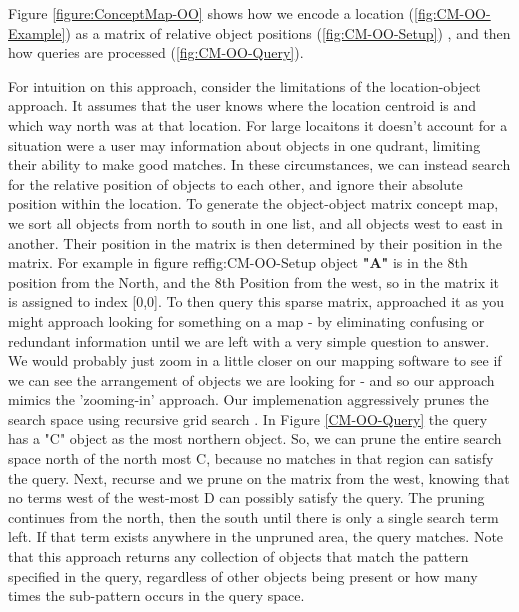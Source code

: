 Figure \ref{figure:ConceptMap-OO} shows how we encode a location (\ref{fig:CM-OO-Example}) as a matrix of relative object positions (\ref{fig:CM-OO-Setup}) , and then how queries are processed (\ref{fig:CM-OO-Query}).

For intuition on this approach, consider the limitations of the location-object approach. 
It assumes that the user knows where the location centroid is and which way north was at that location. 
For large locaitons it doesn't account for a situation were a user may information about objects in one qudrant, limiting their ability to make good matches.  
In these circumstances, we can instead search for the relative position of objects to each other, and ignore their absolute position within the location.
To generate the object-object matrix concept map, we sort all objects from north to south in one list, and all objects west to east in another. Their position in the matrix is then determined by their position in the matrix. For example in figure ref{{fig:CM-OO-Setup}} object \textbf{"A"} is in the 8th position from the North, and the 8th Position from the west, so in the matrix it is assigned to index [0,0].
To then query this sparse matrix, approached it as you might approach looking for something on a map - by eliminating confusing or redundant information until we are left with a very simple question to answer. 
We would probably just zoom in a little closer on our mapping software to see if we can see the arrangement of objects we are looking for - and so our approach mimics the 'zooming-in' approach.
Our implemenation aggressively prunes the search space using recursive grid search . In Figure \ref{CM-OO-Query} the query has a "C" object as the most northern object. 
So, we can prune the entire search space north of the north most C, because no matches in that region can satisfy the query. 
Next, recurse and we prune on the matrix from the west, knowing that no terms west of the west-most D can possibly satisfy the query. 
The pruning continues from the north, then the south until there is only a single search term left. 
If that term exists anywhere in the unpruned area, the query matches. 
Note that this approach returns any collection of objects that match the pattern specified in the query, regardless of other objects being present or how many times the sub-pattern occurs in the query space. 


